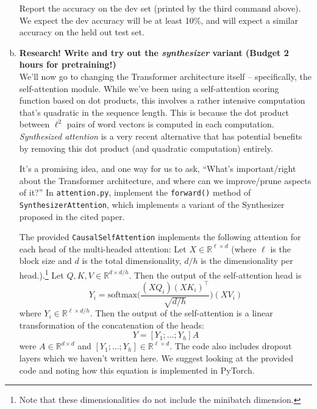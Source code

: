\begin{enumerate}[(a)]
Report the accuracy on the dev set (printed by the third command above). We expect the dev accuracy will be at least 10\%, and will expect a similar accuracy on the held out test set.


\pagebreak %

\item {} \textbf{Research! Write and try out the \textit{synthesizer} variant (Budget 2 hours for pretraining!)}\\
We'll now go to changing the Transformer architecture itself -- specifically, the self-attention module.
While we've been using a self-attention scoring function based on dot products, this involves a rather intensive computation that's quadratic in the sequence length. This is because the dot product between $\ell^2$ pairs of word vectors is computed in each computation.
\textit{Synthesized attention} \cite{tay2020synthesizer} is a very recent alternative that has potential benefits by removing this dot product (and quadratic computation) entirely.

It's a promising idea, and one way for us to ask, ``What's important/right about the Transformer architecture, and where can we improve/prune aspects of it?''
In \texttt{attention.py}, implement the \texttt{forward()} method of \texttt{SynthesizerAttention}, which implements a variant of the Synthesizer proposed in the cited paper.

The provided \texttt{CausalSelfAttention} implements the following attention for each head of the multi-headed attention:
Let $X\in \mathbb{R}^{\ell \times d}$ (where $\ell$ is the block size and $d$ is the total dimensionality, $d/h$ is the dimensionality per head.).\footnote{Note that these dimensionalities do not include the minibatch dimension.}
Let $Q,K,V \in \mathbb{R}^{d\times d/h}$.
Then the output of the self-attention head is 
\begin{equation} \label{qkv_eqn}
Y_i = \text{softmax}\bigg(\frac{(XQ_i)(XK_i)^\top}{\sqrt{d/h}}\bigg)(XV_i)
\end{equation}
where $Y_i\in\mathbb{R}^{\ell \times d/h}$.
Then the output of the self-attention is a linear transformation of the concatenation of the heads:
\begin{equation}
Y = [Y_1;\dots;Y_h]A
\end{equation}
were $A \in\mathbb{R}^{d\times d}$ and $[Y_1;\dots;Y_h]\in\mathbb{R}^{\ell \times d}$.
The code also includes dropout layers which we haven't written here.
We suggest looking at the provided code and noting how this equation is implemented in PyTorch.


\end{enumerate}

